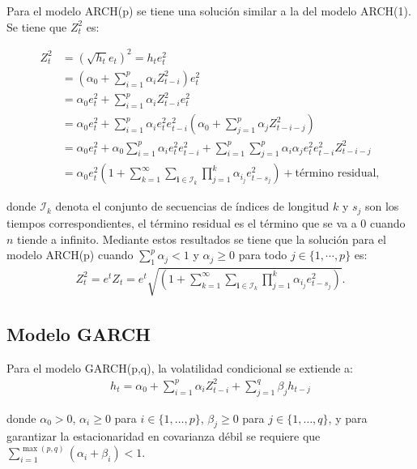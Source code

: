 Para el modelo ARCH(p) se tiene una solución similar a la del modelo ARCH(1). Se tiene que $Z_t^2$ es:

\begin{align*}
    Z_t^2 &= \left(\sqrt{h_t} e_t\right)^2 = h_t e_t^2\\
    &= \left(\alpha_0 + \sum_{i=1}^{p} \alpha_i Z_{t-i}^2\right) e_t^2\\
    &= \alpha_0 e_t^2 + \sum_{i=1}^{p} \alpha_i Z_{t-i}^2 e_t^2\\
    &= \alpha_0 e_t^2 + \sum_{i=1}^{p} \alpha_i e_t^2 e_{t-i}^2 \left(\alpha_0 + \sum_{j=1}^{p} \alpha_j Z_{t-i-j}^2\right)\\
    &= \alpha_0 e_t^2 + \alpha_0 \sum_{i=1}^{p} \alpha_i e_t^2 e_{t-i}^2 + \sum_{i=1}^{p} \sum_{j=1}^{p} \alpha_i \alpha_j e_t^2 e_{t-i}^2 Z_{t-i-j}^2\\
    &= \alpha_0 e_t^2 \left(1 + \sum_{k=1}^{\infty} \sum_{\mathbf{i} \in \mathcal{I}_k} \prod_{j=1}^{k} \alpha_{i_j} e_{t-s_j}^2\right) + \text{término residual},
\end{align*}

donde $\mathcal{I}_k$ denota el conjunto de secuencias de índices de longitud $k$ y $s_j$ son los tiempos correspondientes, el término residual es el término que se va a 0 cuando $n$ tiende a infinito. Mediante estos resultados se tiene que la solución para el modelo ARCH(p) cuando $\sum_{1}^p\alpha_j<1 $ y $\alpha_j\geq 0 $ para todo $j\in \{1,\cdots,p\}$ es: 
\begin{align*}
    Z_t^2= e^{t}Z_t=e^t\sqrt{\left(1 + \sum_{k=1}^{\infty} \sum_{\mathbf{i} \in \mathcal{I}_k} \prod_{j=1}^{k} \alpha_{i_j} e_{t-s_j}^2\right)}.
\end{align*}
\newline



\subsection{Modelo GARCH}

Para el modelo GARCH(p,q), la volatilidad condicional se extiende a:
\begin{align*}
    h_t = \alpha_0 + \sum_{i=1}^{p} \alpha_i Z_{t-i}^2 + \sum_{j=1}^{q} \beta_j h_{t-j}
\end{align*}

donde $\alpha_0 > 0$, $\alpha_i \geq 0$ para $i \in \{1, \ldots, p\}$, $\beta_j \geq 0$ para $j \in \{1, \ldots, q\}$, y para garantizar la estacionaridad en covarianza débil se requiere que $\sum_{i=1}^{\max(p,q)} (\alpha_i + \beta_i) < 1$.
\newline

